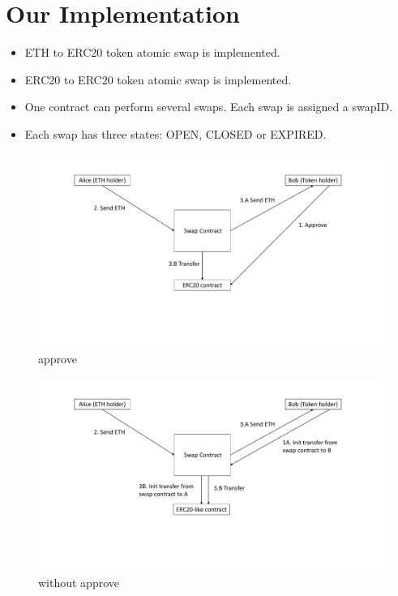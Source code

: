 \section{Our Implementation}

\begin{itemize}
  \item ETH to ERC20 token atomic swap is implemented.
  \item ERC20 to ERC20 token atomic swap is implemented.
  \item One contract can perform several swaps. Each swap is assigned a swapID.
  \item Each swap has three states: OPEN, CLOSED or EXPIRED.
\end{itemize}

\begin{figure}[h!]
\centering
\includegraphics[width=1\textwidth]{approve}
\caption{approve}
\label{fig:withapprove}
\vspace{-10pt}
\end{figure}

\begin{figure}[h!]
\centering
\includegraphics[width=1\textwidth]{withoutapprove}
\caption{without approve}
\label{fig:withapprove}
\vspace{-10pt}
\end{figure}

